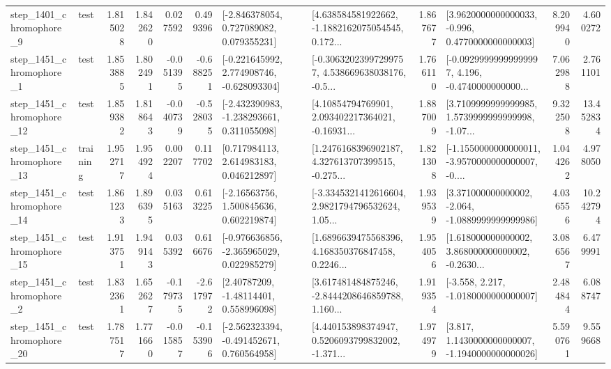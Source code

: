 \begin{tabular}{llrrrrllrlrr}
  step\_1401\_chromophore\_9 &      test &      1.815028 &    1.842620 &      0.027592 &  0.499396 &    [-2.846378054, 0.727089082, 0.079355231] &  [4.638584581922662, -1.1882162075054545, 0.172... &       1.867677 &   [3.9620000000000033, -0.996, 0.4770000000000003] &            8.209940 &          4.600272 \\
  step\_1451\_chromophore\_1 &      test &      1.853885 &    1.802491 &     -0.051395 & -0.688251 &   [-0.221645992, 2.774908746, -0.628093304] &  [-0.30632023997299757, 4.538669638038176, -0.5... &       1.766110 &  [-0.09299999999999997, 4.196, -0.4740000000000... &            7.062988 &          2.761101 \\
 step\_1451\_chromophore\_12 &      test &      1.859382 &    1.818643 &     -0.040739 & -0.528035 &   [-2.432390983, -1.238293661, 0.311055098] &  [4.10854794769901, 2.093402217364021, -0.16931... &       1.887009 &  [3.7109999999999985, 1.5739999999999998, -1.07... &            9.322508 &         13.452834 \\
 step\_1451\_chromophore\_13 &  training &      1.952717 &    1.954924 &      0.002207 &  0.117702 &     [0.717984113, 2.614983183, 0.046212897] &  [1.2476168396902187, 4.327613707399515, -0.275... &       1.821308 &  [-1.1550000000000011, -3.9570000000000007, -0.... &            1.044262 &          4.978050 \\
 step\_1451\_chromophore\_14 &      test &      1.861233 &    1.896395 &      0.035163 &  0.613225 &     [-2.16563756, 1.500845636, 0.602219874] &  [-3.3345321412616604, 2.9821794796532624, 1.05... &       1.939539 &   [3.371000000000002, -2.064, -1.0889999999999986] &            4.036556 &         10.242794 \\
 step\_1451\_chromophore\_15 &      test &      1.913751 &    1.949143 &      0.035392 &  0.616676 &   [-0.976636856, -2.365965029, 0.022985279] &  [1.6896639475568396, 4.168350376847458, 0.2246... &       1.954056 &  [1.618000000000002, 3.868000000000002, -0.2630... &            3.086567 &          6.479991 \\
  step\_1451\_chromophore\_2 &      test &      1.832361 &    1.652627 &     -0.179735 & -2.617972 &      [2.40787209, -1.48114401, 0.558996098] &  [3.617481484875246, -2.8444208646859788, 1.160... &       1.919354 &               [-3.558, 2.217, -1.0180000000000007] &            2.484844 &          6.088747 \\
 step\_1451\_chromophore\_20 &      test &      1.787517 &    1.771660 &     -0.015857 & -0.153906 &   [-2.562323394, -0.491452671, 0.760564958] &  [4.440153898374947, 0.5206093799832002, -1.371... &       1.974979 &   [3.817, 1.1430000000000007, -1.1940000000000026] &            5.590761 &          9.559668 \\

\end{tabular}
